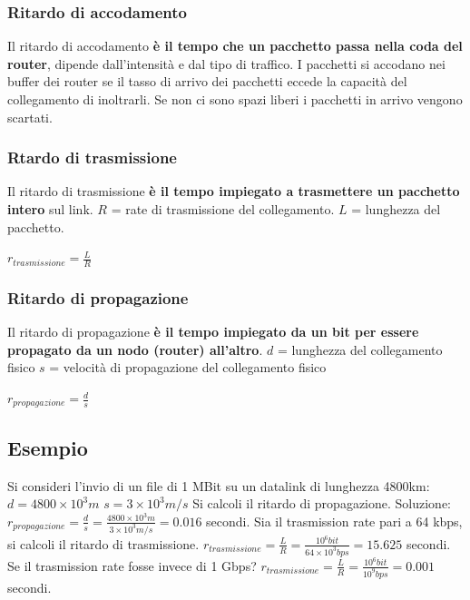 \documentclass[11pt,a4paper]{article}
\theoremstyle{definition}
\begin{document}
\subsubsection{Ritardo di accodamento}
Il ritardo di accodamento \textbf{è il tempo che un pacchetto passa nella coda del router}, dipende dall'intensità e dal tipo di traffico. I pacchetti si accodano nei buffer dei router se il tasso di arrivo dei pacchetti eccede la capacità del collegamento di inoltrarli. Se non ci sono spazi liberi i pacchetti in arrivo vengono scartati.

\subsubsection{Rtardo di trasmissione}
Il ritardo di trasmissione \textbf{è il tempo impiegato a trasmettere un pacchetto intero} sul link.\newline
$R$ = rate di trasmissione del collegamento.\newline
$L$ = lunghezza del pacchetto.\newline
\centerline{$r_{trasmissione} = \frac{L}{R}$}

\subsubsection{Ritardo di propagazione}
Il ritardo di propagazione \textbf{è il tempo impiegato da un bit per essere propagato da un nodo (router) all'altro}.\newline
$d$ = lunghezza del collegamento fisico\newline
$s$ = velocità di propagazione del collegamento fisico \newline
\centerline{$r_{propagazione} = \frac{d}{s}$}

\subsection{Esempio}
Si consideri l'invio di un file di 1 MBit su un datalink di lunghezza 4800km:\newline
$d = 4800\times10^3 m$ \newline
$s = 3\times10^3 m/s$ \newline
Si calcoli il ritardo di propagazione. \newline
Soluzione:\newline
$r_{propagazione} = \frac{d}{s} = \frac{4800\times10^3 m }{3\times10^3 m/s}  = 0.016$ secondi.\newline
Sia il trasmission rate pari a 64 kbps, si calcoli il ritardo di trasmissione. \newline
$r_{trasmissione} = \frac{L}{R} = \frac{10^6 bit}{64\times10^3 bps}= 15.625$ secondi.\newline
Se il trasmission rate fosse invece di 1 Gbps? \newline
$r_{trasmissione} = \frac{L}{R} = \frac{10^6 bit}{10^9 bps} = 0.001$ secondi.
\end{document}
